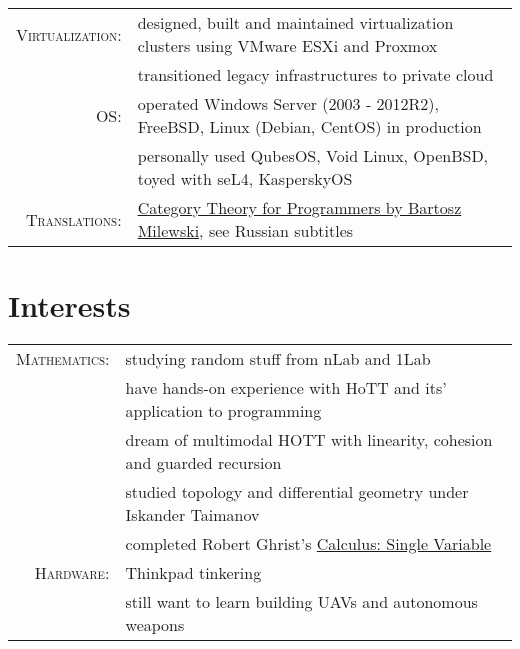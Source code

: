\documentclass[a4paper,11pt]{article}
\begin{document}
\begin{longtable}{rp{}}
      \textsc{Virtualization:} & designed, built and maintained virtualization clusters using VMware ESXi and Proxmox  \\
                               & transitioned legacy infrastructures to private cloud                                  \\

      \textsc{OS:} & operated Windows Server (2003 - 2012R2), FreeBSD, Linux (Debian, CentOS) in production  \\
                   & personally used QubesOS, Void Linux, OpenBSD, toyed with seL4, KasperskyOS              \\

      \textsc{Translations:} & \href{https://www.youtube.com/playlist?list=PLbgaMIhjbmEnaH\_LTkxLI7FMa2HsnawM\_}
                               {Category Theory for Programmers by Bartosz Milewski}, see Russian subtitles       \\
    \end{longtable}

  \section{Interests}
    \begin{tabular}{rl}
      \textsc{Mathematics:} & studying random stuff from nLab and 1Lab                                              \\
                            & have hands-on experience with HoTT and its' application to programming                \\
                            & dream of multimodal HOTT with linearity, cohesion and guarded recursion               \\
                            & studied topology and differential geometry under Iskander Taimanov                    \\
                            & completed Robert Ghrist's
                              \href{https://www.coursera.org/account/accomplishments/records/9Y3N9X2BMR}{Calculus:
                              Single Variable}                                                                      \\
      \textsc{Hardware:} & Thinkpad tinkering                                        \\
                         & still want to learn building UAVs and autonomous weapons  \\
    \end{tabular}
\end{document}
